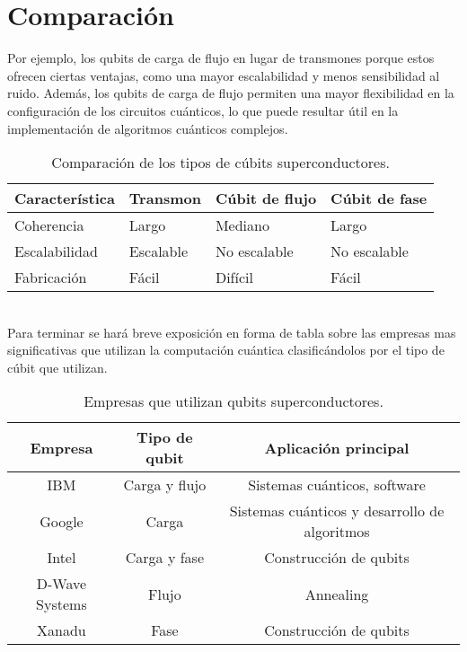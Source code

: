 \documentclass[12pt]{article}
\begin{document}
\section{Comparación} 
 Por ejemplo, los qubits de carga de flujo en lugar de transmones porque estos ofrecen ciertas ventajas, como una mayor escalabilidad y menos sensibilidad al ruido. Además, los qubits de carga de flujo permiten una mayor flexibilidad en la configuración de los circuitos cuánticos, lo que puede resultar útil en la implementación de algoritmos cuánticos complejos.\\
 \begin{table}[ht]
  \small
    \begin{center}
      \begin{tabularx}{\textwidth}{|X|X|X|X|}
      \hline
      \textbf{Característica} & \textbf{Transmon} & \textbf{Cúbit de flujo} & \textbf{Cúbit de fase} \\ \hline
      Coherencia & Largo & Mediano & Largo \\
      Escalabilidad & Escalable & No escalable & No escalable \\
      Fabricación & Fácil & Difícil & Fácil \\
      \hline
      \end{tabularx}
      \caption{Comparación de los tipos de cúbits superconductores.}
      \label{tab:comparacion-cubits-superconductores-transpuesta}
    \end{center}
\end{table}\\
 Para terminar se hará breve exposición en forma de tabla sobre las empresas mas significativas que utilizan la computación cuántica clasificándolos por el tipo de cúbit que utilizan.
 \begin{table}[ht]
  \begin{center}
    \begin{tabularx}{\textwidth}{|c|c|c|}
      \hline
      \textbf{Empresa} & \textbf{Tipo de qubit} & \textbf{Aplicación principal} \\ \hline
       IBM & Carga y flujo & Sistemas cuánticos, software \\
      Google & Carga & Sistemas cuánticos y desarrollo de algoritmos \\
      Intel & Carga y fase & Construcción de qubits \\
      D-Wave Systems & Flujo & Annealing \\
      Xanadu & Fase & Construcción de qubits \\ \hline
    \end{tabularx}
  \caption{Empresas que utilizan qubits superconductores.}
  \label{tab:empresas-qubits-superconductores}
  \end{center}
\end{table}
\end{document}
